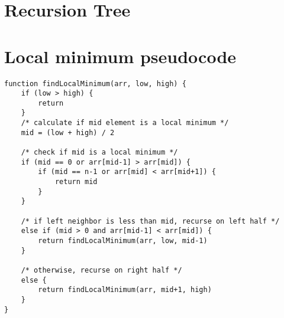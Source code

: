 \section{Recursion Tree}

\section{Local minimum pseudocode}

\begin{lstlisting}[style=txt]
function findLocalMinimum(arr, low, high) {
	if (low > high) {
		return 
	}
	/* calculate if mid element is a local minimum */
	mid = (low + high) / 2 

	/* check if mid is a local minimum */
	if (mid == 0 or arr[mid-1] > arr[mid]) {
		if (mid == n-1 or arr[mid] < arr[mid+1]) {
			return mid
		}
	}

	/* if left neighbor is less than mid, recurse on left half */
	else if (mid > 0 and arr[mid-1] < arr[mid]) {
		return findLocalMinimum(arr, low, mid-1)
	}

	/* otherwise, recurse on right half */
	else {
		return findLocalMinimum(arr, mid+1, high)
	}
}
\end{lstlisting}
